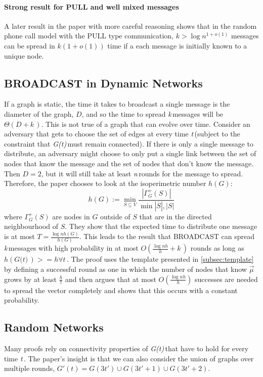 \documentclass{article} %
\def\numNodes{\textit{n}\,}
\def\graph{\textit{G(t)}\,}
\def\graphtime{\textit{t}\,}
\def\numMessages{\textit{k}\,}
\begin{document}
\paragraph{Strong result for PULL and well mixed messages}
A later result in the paper with more careful reasoning shows that in the random phone call model with the PULL type communication, $k>\log{n}^{1+o(1)}$ messages can be spread in $k(1+o(1))$ time if a each message is initially known to a unique node.

\subsection{BROADCAST in Dynamic Networks}
If a graph is static, the time it takes to broadcast a single message is the diameter of the graph, $D$, and so the time to spread \numMessages messages will be $\Theta(D + \numMessages)$. This is not true of a graph that can evolve over time. Consider an adversary that gets to choose the set of edges at every time \graphtime (subject to the constraint that \graph must remain connected). If there is only a single message to distribute, an adversary might choose to only put a single link between the set of nodes that know the message and the set of nodes that don't know the message. Then $D=2$, but it will still take at least \numNodes rounds for the message to spread. Therefore, the paper chooses to look at the isoperimetric number $h(G)$:
\begin{equation}
h(G) := \min\limits_{S \subseteq V}{\frac{|\Gamma^{+}_G(S)|}{\min{|\overline{S}|,|S|}}}
\end{equation} 
where $\Gamma^{+}_G(S)$ are nodes in $G$ outside of $S$ that are in the directed neighbourhood of $S$. They show that the expected time to distribute one message is at most $T=\frac{\log{nh(G)}}{h(G)}$. This leads to the result that BROADCAST can spread \numMessages messages with high probability in at most $O(\frac{\log{nh}}{h} + \numMessages)$ rounds as long as $h(\graph) >= h \forall \graphtime$. The proof uses the template presented in  \ref{subsec:template} by defining a successful round as one in which the number of nodes that know $\vec{\mu}$ grows by at least $\frac{h}{7}$ and then argues that at most $O(\frac{\log{nh}}{h})$ successes are needed to spread the vector completely and shows that this occurs with a constant probability. 

\subsection{Random Networks}
Many proofs rely on connectivity properties of \graph that have to hold for every time \graphtime. The paper's insight is that we can also consider the union of graphs over multiple rounds, $G'(t) = G(3t') \cup G(3t'+1) \cup G(3t'+2)$.
\end{document}
